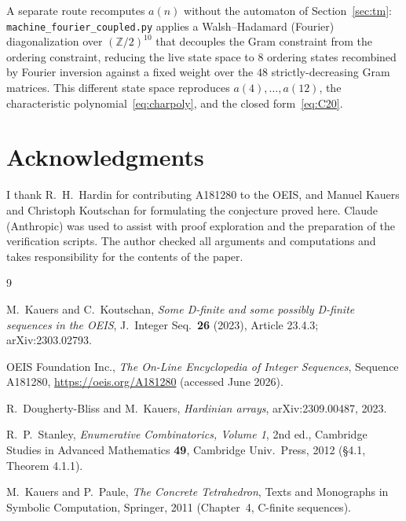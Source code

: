 \documentclass[11pt]{article}
\theoremstyle{definition}
\newcommand{\Z}{\mathbb{Z}}
\begin{document}
A separate route recomputes $a(n)$ without the automaton of Section~\ref{sec:tm}:
\texttt{machine\_fourier\_coupled.py} applies a Walsh--Hadamard (Fourier) diagonalization over
$(\Z/2)^{10}$ that decouples the Gram constraint from the ordering constraint, reducing the live
state space to $8$ ordering states recombined by Fourier inversion against a fixed weight over the
$48$ strictly-decreasing Gram matrices. This different state space reproduces $a(4),\dots,a(12)$,
the characteristic polynomial~\eqref{eq:charpoly}, and the closed form~\eqref{eq:C20}.

\section*{Acknowledgments}

I thank R.~H.~Hardin for contributing A181280 to the OEIS, and Manuel Kauers and Christoph
Koutschan for formulating the conjecture proved here. Claude (Anthropic) was used to assist with
proof exploration and the preparation of the verification scripts. The author checked all
arguments and computations and takes responsibility for the contents of the paper.

\begin{thebibliography}{9}

M.~Kauers and C.~Koutschan,
\emph{Some D-finite and some possibly D-finite sequences in the OEIS},
J.~Integer Seq.\ \textbf{26} (2023), Article 23.4.3; arXiv:2303.02793.

OEIS Foundation Inc.,
\emph{The On-Line Encyclopedia of Integer Sequences},
Sequence A181280, \url{https://oeis.org/A181280} (accessed June 2026).

R.~Dougherty-Bliss and M.~Kauers,
\emph{Hardinian arrays},
arXiv:2309.00487, 2023.

R.~P.~Stanley,
\emph{Enumerative Combinatorics, Volume 1}, 2nd ed.,
Cambridge Studies in Advanced Mathematics \textbf{49}, Cambridge Univ.\ Press, 2012
(\S4.1, Theorem 4.1.1).

M.~Kauers and P.~Paule,
\emph{The Concrete Tetrahedron},
Texts and Monographs in Symbolic Computation, Springer, 2011
(Chapter~4, C-finite sequences).

\end{thebibliography}
\end{document}
